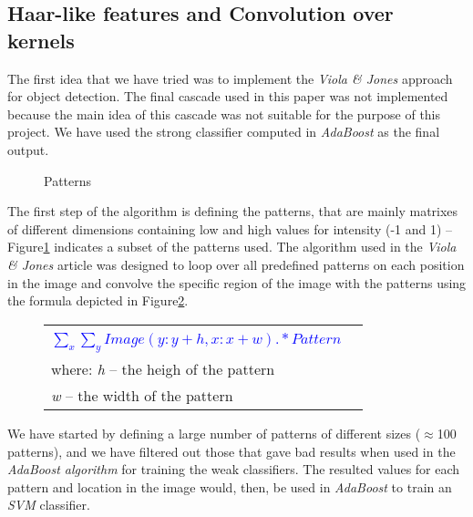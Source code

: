 \documentclass[11pt,twocolumn]{article}
\begin{document}
	\subsection{Haar-like features and Convolution over kernels}\label{sec:Haar}
	\hspace*{10px}The first idea that we have tried was to implement the \emph{Viola \& Jones} approach for object detection. The final cascade used in this paper was not implemented because the main idea of this cascade was not suitable for the purpose of this project. We have used the strong classifier computed in \emph{AdaBoost} as the final output.\\
\begin{figure}[!hbtp] 
\caption{Patterns}
\label{patterns}
\end{figure}
	\hspace*{10px}The first step of the algorithm is defining the patterns, that are mainly matrixes of different dimensions containing low and high values for intensity (-1 and 1) -- Figure\ref{patterns} indicates a subset of the patterns used. The algorithm used in the \emph{Viola \& Jones} article was designed to loop over all predefined patterns on each position in the image and convolve the specific region of the image with the patterns using the formula depicted in Figure\ref{patterns_formula}.\\
\begin{figure}
\selectfont\small
\caption{}
\begin{tabular}{|lr|} \hline
	& \\[5pt]
	\textcolor{blue}{$\sum_x\sum_y Image(y:y+h,x:x+w) .* Pattern$} &\\[10pt]
	where: \emph{h} -- the heigh of the pattern &\\
	\hspace*{28px} \emph{w} -- the width of the pattern &\\[5pt] 
\hline 
\end{tabular}
\label{patterns_formula}
\end{figure}
\hspace*{10px}We have started by defining a large number of patterns of different sizes ($\approx$100 patterns), and we have filtered out those that gave bad results when used in the \emph{AdaBoost algorithm} for training the weak classifiers. The resulted values for each pattern and location in the image would, then, be used in \emph{AdaBoost} to train an \emph{SVM} classifier.\\
\end{document}
